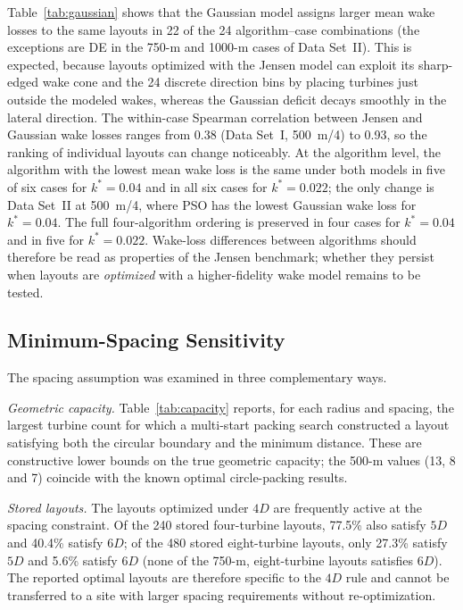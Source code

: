 Table~\ref{tab:gaussian} shows that the Gaussian model assigns larger mean wake losses to the same layouts in 22 of the 24 algorithm--case combinations (the exceptions are DE in the 750-m and 1000-m cases of Data Set~II). This is expected, because layouts optimized with the Jensen model can exploit its sharp-edged wake cone and the 24 discrete direction bins by placing turbines just outside the modeled wakes, whereas the Gaussian deficit decays smoothly in the lateral direction. The within-case Spearman correlation between Jensen and Gaussian wake losses ranges from 0.38 (Data Set~I, 500~m/4) to 0.93, so the ranking of individual layouts can change noticeably. At the algorithm level, the algorithm with the lowest mean wake loss is the same under both models in five of six cases for $k^*=0.04$ and in all six cases for $k^*=0.022$; the only change is Data Set~II at 500~m/4, where PSO has the lowest Gaussian wake loss for $k^*=0.04$. The full four-algorithm ordering is preserved in four cases for $k^*=0.04$ and in five for $k^*=0.022$. Wake-loss differences between algorithms should therefore be read as properties of the Jensen benchmark; whether they persist when layouts are \emph{optimized} with a higher-fidelity wake model remains to be tested.

\subsection{Minimum-Spacing Sensitivity}
\label{sec:spacing}
The spacing assumption was examined in three complementary ways.

\emph{Geometric capacity.} Table~\ref{tab:capacity} reports, for each radius and spacing, the largest turbine count for which a multi-start packing search constructed a layout satisfying both the circular boundary and the minimum distance. These are constructive lower bounds on the true geometric capacity; the 500-m values (13, 8 and 7) coincide with the known optimal circle-packing results. %

\emph{Stored layouts.} The layouts optimized under $4D$ are frequently active at the spacing constraint. Of the 240 stored four-turbine layouts, 77.5\% also satisfy $5D$ and 40.4\% satisfy $6D$; of the 480 stored eight-turbine layouts, only 27.3\% satisfy $5D$ and 5.6\% satisfy $6D$ (none of the 750-m, eight-turbine layouts satisfies $6D$). The reported optimal layouts are therefore specific to the $4D$ rule and cannot be transferred to a site with larger spacing requirements without re-optimization.

